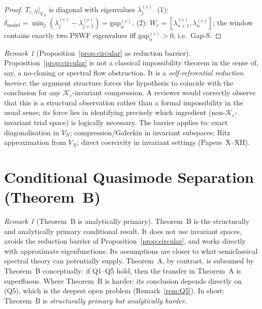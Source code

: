 \documentclass[12pt,a4paper]{amsart}
\theoremstyle{definition}
\theoremstyle{remark}
\newtheorem{remark}[theorem]{Remark}
\newcommand{\Kc}{\mathcal{K}_c}
\newcommand{\lam}[2]{\lambda_{#2}^{(#1)}}
\newcommand{\gap}[2]{\mathrm{gap}_{#2}^{(#1)}}
\begin{document}
\begin{proof}
$T_{c,N}|_{V_N}$ is diagonal with eigenvalues $\lam{c}{j}$.
(1): $\delta_{\mathrm{model}} = \min_j(\lam{c}{j}-\lam{c}{j+1}) = \gap{c}{n}$.
(2): $W_c = [\lam{c}{n+1}, \lam{c}{n}]$; the window contains
exactly two PSWF eigenvalues iff $\gap{c}{n} > 0$, i.e.\ Gap-S.
\end{proof}

\begin{remark}[Proposition~\ref{prop:circular} as reduction barrier]
\label{rem:circular-barrier}
Proposition~\ref{prop:circular} is not a classical impossibility theorem
in the sense of, say, a no-cloning or spectral flow obstruction.
It is a \emph{self-referential reduction barrier}:
the argument structure forces the hypothesis to coincide with the conclusion
for any $\Kc$-invariant compression.
A reviewer would correctly observe that this is a structural observation
rather than a formal impossibility in the usual sense;
its force lies in identifying precisely which ingredient
(non-$\Kc$-invariant trial space) is logically necessary.
The barrier applies to:
exact diagonalisation in $V_N$;
compression/Galerkin in invariant subspaces;
Ritz approximation from $V_N$;
direct coercivity in invariant settings (Papers~X--XII).
\end{remark}

\section{Conditional Quasimode Separation (Theorem~B)}
\label{sec:quasimode}

\begin{remark}[Theorem~B is analytically primary]
\label{rem:thmB-primary}
Theorem~B is the structurally and analytically primary conditional result.
It does not use invariant spaces, avoids the reduction barrier of
Proposition~\ref{prop:circular}, and works directly with approximate
eigenfunctions.
Its assumptions are closer to what semiclassical spectral theory
can potentially supply.
Theorem~A, by contrast, is subsumed by Theorem~B conceptually:
if Q1--Q5 hold, then the transfer in Theorem~A is superfluous.
Where Theorem~B is harder: its conclusion depends directly on (Q5),
which is the deepest open problem (Remark~\ref{rem:Q5}).
In short: Theorem~B is \emph{structurally primary but analytically harder}.
\end{remark}
\end{document}
